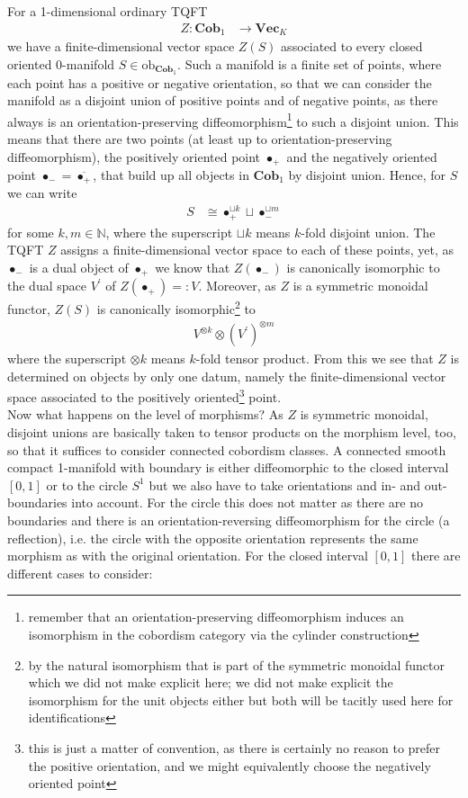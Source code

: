 For a 1-dimensional ordinary TQFT
\begin{align*}
  Z
  \colon
  \mathbf{Cob}_{1}
  &\to
  \mathbf{Vec}_{K}
\end{align*}
we have a finite-dimensional vector space $Z(S)$ associated to every closed oriented $0$-manifold $S \in \mathrm{ob}_{\mathbf{Cob}_{1}}$. Such a manifold is a finite set of points, where each point has a positive or negative orientation, so that we can consider the manifold as a disjoint union of positive points and of negative points, as there always is an orientation-preserving diffeomorphism\footnote{remember that an orientation-preserving diffeomorphism induces an isomorphism in the cobordism category via the cylinder construction} to such a disjoint union. This means that there are two points (at least up to orientation-preserving diffeomorphism), the positively oriented point $\bullet_{+}$ and the negatively oriented point $\bullet_{-} = \overline{\bullet_{+}}$, that build up all objects in $\mathbf{Cob}_{1}$ by disjoint union. Hence, for $S$ we can write
\begin{align*}
  S
  &\cong
  \bullet_{+}^{\sqcup k}
  \sqcup
  \bullet_{-}^{\sqcup m}
\end{align*}
for some $k,m \in \mathbb{N}$, where the superscript $\sqcup k$ means $k$-fold disjoint union. The TQFT $Z$ assigns a finite-dimensional vector space to each of these points, yet, as $\bullet_{-}$ is a dual object of $\bullet_{+}$ we know that $Z(\bullet_{-})$ is canonically isomorphic to the dual space $V^{\prime}$ of $Z(\bullet_{+}) =: V$. Moreover, as $Z$ is a symmetric monoidal functor, $Z(S)$ is canonically isomorphic\footnote{by the natural isomorphism that is part of the symmetric monoidal functor which we did not make explicit here; we did not make explicit the isomorphism for the unit objects either but both will be tacitly used here for identifications} to
\begin{align*}
  V^{\otimes k}
  \otimes
  (V^{\prime})^{\otimes m}
\end{align*}
where the superscript $\otimes k$ means $k$-fold tensor product. From this we see that $Z$ is determined on objects by only one datum, namely the finite-dimensional vector space associated to the positively oriented\footnote{this is just a matter of convention, as there is certainly no reason to prefer the positive orientation, and we might equivalently choose the negatively oriented point} point.
\\
Now what happens on the level of morphisms? As $Z$ is symmetric monoidal, disjoint unions are basically taken to tensor products on the morphism level, too, so that it suffices to consider connected cobordism classes. A connected smooth compact 1-manifold with boundary is either diffeomorphic to the closed interval $[0,1]$ or to the circle $S^{1}$ but we also have to take orientations and in- and out-boundaries into account. For the circle this does not matter as there are no boundaries and there is an orientation-reversing diffeomorphism for the circle (a reflection), i.e. the circle with the opposite orientation represents the same morphism as with the original orientation. For the closed interval $[0,1]$ there are different cases to consider:
